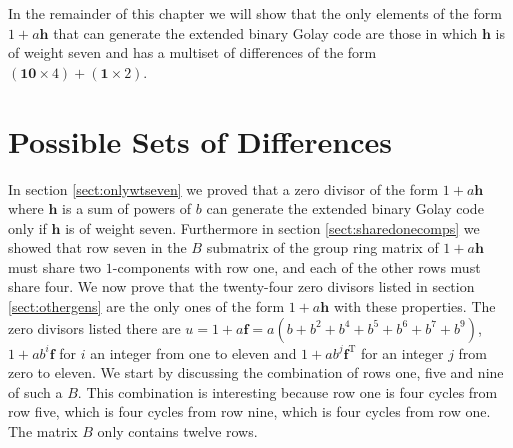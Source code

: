 In the remainder of this chapter we will show that the only elements of the form $1 + a \mathbf{h}$ that can generate the extended binary Golay code are those in which $\mathbf{h}$ is of weight seven and has a multiset of differences of the form $(\mathbf{10} \times 4) + (\mathbf{1} \times 2)$.

\section{Possible Sets of Differences}
In section \ref{sect:onlywtseven} we proved that a zero divisor of the form $1 + a \mathbf{h}$ where $\mathbf{h}$ is a sum of powers of $b$ can generate the extended binary Golay code only if $\mathbf{h}$ is of weight seven.
Furthermore in section \ref{sect:sharedonecomps} we showed that row seven in the $B$ submatrix of the group ring matrix of $1 + a \mathbf{h}$ must share two $1$-components with row one, and each of the other rows must share four.
We now prove that the twenty-four zero divisors listed in section \ref{sect:othergens} are the only ones of the form $1+ a \mathbf{h}$ with these properties.
The zero divisors listed there are $u = 1 + a \mathbf{f} = a(b + b^2 + b^4 + b^5 + b^6 + b^7 + b^9)$, $1+a b^i \mathbf{f}$ for $i$ an integer from one to eleven and $1+a b^j \mathbf{f}^{\textrm{T}}$ for an integer $j$ from zero to eleven.
We start by discussing the combination of rows one, five and nine of such a $B$.
This combination is interesting because row one is four cycles from row five, which is four cycles from row nine, which is four cycles from row one.
The matrix $B$ only contains twelve rows.

